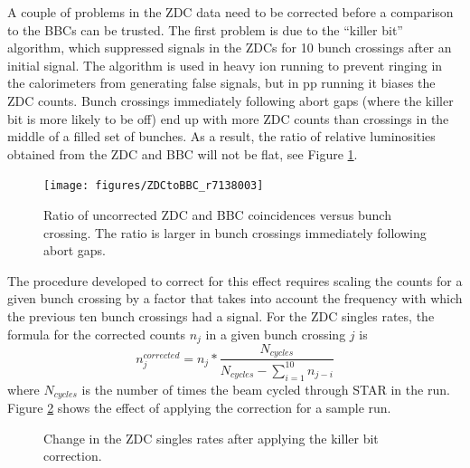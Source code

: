 A couple of problems in the ZDC data need to be corrected before a comparison
to the BBCs can be trusted. The first problem is due to the ``killer bit''
algorithm, which suppressed signals in the ZDCs for 10 bunch crossings after
an initial signal. The algorithm is used in heavy ion running to prevent
ringing in the calorimeters from generating false signals, but in pp running
it biases the ZDC counts. Bunch crossings immediately following abort gaps
(where the killer bit is more likely to be off) end up with more ZDC counts
than crossings in the middle of a filled set of bunches. As a result, the
ratio of relative luminosities obtained from the ZDC and BBC will not be flat,
see Figure \ref{fig:zdctobbc6170012zoom}.

\begin{figure}
  \texttt{[image: figures/ZDCtoBBC\_r7138003]}
  \caption{Ratio of uncorrected ZDC and BBC coincidences versus bunch crossing.  The ratio is larger in bunch crossings immediately following abort gaps.}
  \label{fig:zdctobbc6170012zoom}
\end{figure}

The procedure developed to correct for this effect requires scaling the counts
for a given bunch crossing by a factor that takes into account the frequency
with which the previous ten bunch crossings had a signal. For the ZDC singles
rates, the formula for the corrected counts $n_{j}$ in a given bunch crossing
$j$ is
%
\begin{equation}
  n_{j}^{corrected} = n_{j} * \frac{N_{cycles}}{N_{cycles} - \sum_{i=1}^{10}n_{j-i}}
\end{equation}
%
where $N_{cycles}$ is the number of times the beam cycled through STAR in the
run. Figure \ref{fig:zdc-singles-ratio} shows the effect of applying the
correction for a sample run.

\begin{figure}
  \caption{Change in the ZDC singles rates after applying the killer bit correction.}
  \label{fig:zdc-singles-ratio}
\end{figure}

